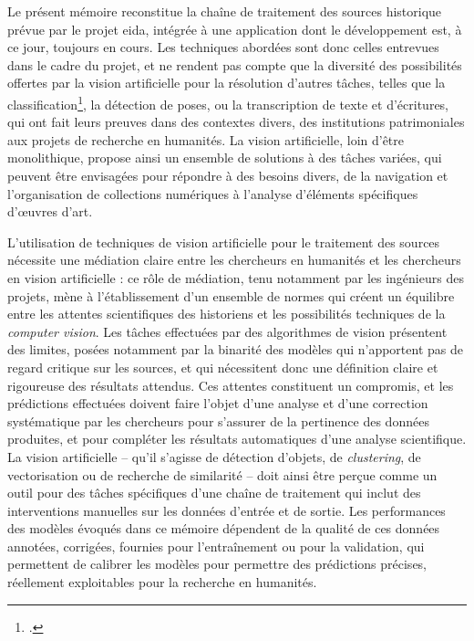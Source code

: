 \documentclass[a4paper,12pt,twoside]{book}
\newcommand{\cv}{\textit{computer vision}\xspace}
\newcommand{\eida}{\gls{eida}\xspace}
\begin{document}
	Le présent mémoire reconstitue la chaîne de traitement des sources historique prévue par le projet \eida, intégrée à une application dont le développement est, à ce jour, toujours en cours. Les techniques abordées sont donc celles entrevues dans le cadre du projet, et ne rendent pas compte que la diversité des possibilités offertes par la vision artificielle pour la résolution d'autres tâches, telles que la classification\footcite{shenLargeScaleHistoricalWatermark2019}, la détection de poses, ou la transcription de texte et d'écritures, qui ont fait leurs preuves dans des contextes divers, des institutions patrimoniales aux projets de recherche en humanités. La vision artificielle, loin d'être monolithique, propose ainsi un ensemble de solutions à des tâches variées, qui peuvent être envisagées pour répondre à des besoins divers, de la navigation et l'organisation de collections numériques à l'analyse d'éléments spécifiques d'œuvres d'art.
	
	L'utilisation de techniques de vision artificielle pour le traitement des sources nécessite une médiation claire entre les chercheurs en humanités et les chercheurs en vision artificielle : ce rôle de médiation, tenu notamment par les ingénieurs des projets, mène à l'établissement d'un ensemble de normes qui créent un équilibre entre les attentes scientifiques des historiens et les possibilités techniques de la \cv. Les tâches effectuées par des algorithmes de vision présentent des limites, posées notamment par la binarité des modèles qui n'apportent pas de regard critique sur les sources, et qui nécessitent donc une définition claire et rigoureuse des résultats attendus. Ces attentes constituent un compromis, et les prédictions effectuées doivent faire l'objet d'une analyse et d'une correction systématique par les chercheurs pour s'assurer de la pertinence des données produites, et pour compléter les résultats automatiques d'une analyse scientifique. La vision artificielle -- qu'il s'agisse de détection d'objets, de \textit{clustering}, de vectorisation ou de recherche de similarité -- doit ainsi être perçue comme un outil pour des tâches spécifiques d'une chaîne de traitement qui inclut des interventions manuelles sur les données d'entrée et de sortie. Les performances des modèles évoqués dans ce mémoire dépendent de la qualité de ces données annotées, corrigées, fournies pour l'entraînement ou pour la validation, qui permettent de calibrer les modèles pour permettre des prédictions précises, réellement exploitables pour la recherche en humanités.
	
\end{document}
